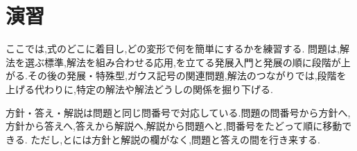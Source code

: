
\section{演習}\label{節：演習}
ここでは,式のどこに着目し,どの変形で何を簡単にするかを練習する.
問題は,解法を選ぶ標準,解法を組み合わせる応用,を立てる発展入門と発展の順に段階が上がる.その後の発展・特殊型,ガウス記号の関連問題,解法のつながりでは,段階を上げる代わりに,特定の解法や解法どうしの関係を掘り下げる.
\par\smallskip
方針・答え・解説は問題と同じ問番号で対応している.問題の問番号から方針へ,方針から答えへ,答えから解説へ,解説から問題へと,問番号をたどって順に移動できる.
ただし,とには方針と解説の欄がなく,問題と答えの間を行き来する.

